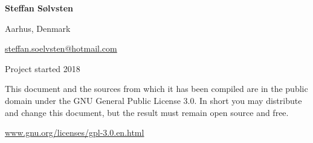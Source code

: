\textbf{Steffan Sølvsten}

Aarhus, Denmark

\href{mailto:steffan.soelvsten@hotmail.com}{steffan.soelvsten@hotmail.com}

\vspace{1em}
\noindent Project started 2018

\vspace{1em}
\noindent This document and the sources from which it has been compiled are in
the public domain under the GNU General Public License 3.0. In short you may
distribute and change this document, but the result must remain open source and
free.

\begin{center}
  \href{https://www.gnu.org/licenses/gpl-3.0.en.html}{www.gnu.org/licenses/gpl-3.0.en.html}
\end{center}
